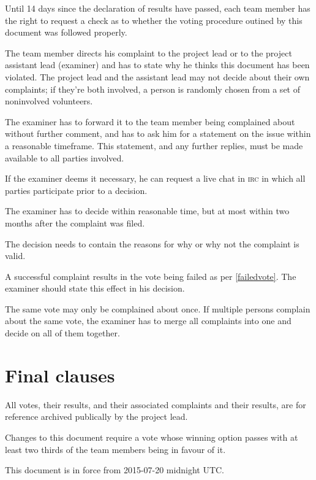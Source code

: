\documentclass[10pt,a4paper,DIV=calc,headings=medium,twocolumn,draft]{scrartcl}
\newcommand\irc{\textsc{irc}\xspace}
\begin{document}
\begin{contract}

  Until 14 days since the declaration of results have passed, each
  team member has the right to request a check as to whether the
  voting procedure outined by this document was followed properly.


  The team member directs his complaint to the project lead or to the
  project assistant lead (examiner) and has to state why he thinks
  this document has been violated. The project lead and the assistant
  lead may not decide about their own complaints; if they’re both
  involved, a person is randomly chosen from a set of noninvolved
  volunteers.

  The examiner has to forward it to the team member being complained
  about without further comment, and has to ask him for a statement on
  the issue within a reasonable timeframe. This statement, and any
  further replies, must be made available to all parties involved.

  If the examiner deems it necessary, he can request a live chat in
  \irc in which all parties participate prior to a decision.


  The examiner has to decide within reasonable time, but at most
  within two months after the complaint was filed.

  The decision needs to contain the reasons for why or why not the
  complaint is valid.


  A successful complaint results in the vote being failed as per
  \ref{failedvote}. The examiner should state this effect in his
  decision.


  The same vote may only be complained about once. If multiple persons
  complain about the same vote, the examiner has to merge all
  complaints into one and decide on all of them together.
\end{contract}

\section{Final clauses}

\begin{contract}

  All votes, their results, and their associated complaints and their
  results, are for reference archived publically by the project lead.


  Changes to this document require a vote whose winning option passes
  with at least two thirds of the team members being in favour of it.


  This document is in force from 2015-07-20 midnight UTC.
\end{contract}
\end{document}
